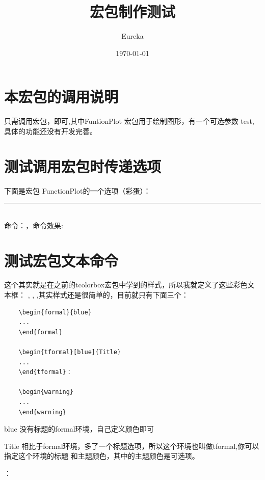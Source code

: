 \documentclass[12pt]{article}
\title{宏包制作测试}
\author{Eureka}
\date{\today}
\begin{document}
\maketitle


\section{本宏包的调用说明}
只需调用宏包，即可,其中FuntionPlot
宏包用于绘制图形，有一个可选参数 test,具体的功能还没有开发完善。

\section{测试调用宏包时传递选项}
下面是宏包 {\ttfamily FunctionPlot}的一个选项（彩蛋）：

\noindent\rule{.9\linewidth}{2pt}\\
命令：，命令效果:\test


\section{测试宏包文本命令}
这个其实就是在之前的tcolorbox宏包中学到的样式，所以我就定义了这些彩色文本框： 
,\; ,\; ,其实样式还是很简单的，目前就只有下面三个：

\vspace*{2em}
\begin{lstlisting}
    \begin{formal}{blue}
    ...
    \end{formal}
    
    \begin{tformal}[blue]{Title}
    ...
    \end{tformal}：
    
    \begin{warning}
    ...
    \end{warning}
    \end{lstlisting}

\begin{formal}{blue}
    没有标题的formal环境，自己定义颜色即可
\end{formal}

\begin{tformal}[blue]{Title}
    相比于formal环境，多了一个标题选项，所以这个环境也叫做tformal,你可以指定这个环境的标题
    和主题颜色，其中的主题颜色是可选项。
\end{tformal}：
\end{document}
